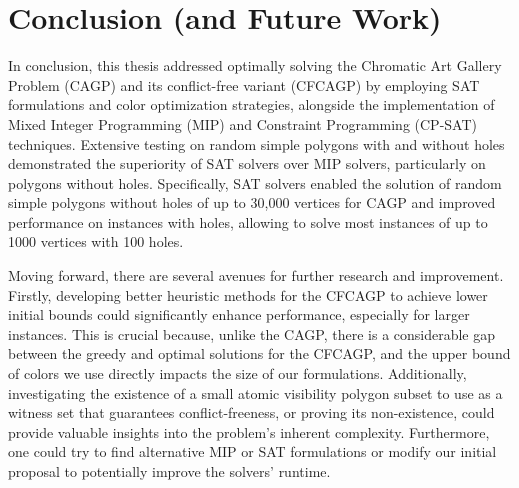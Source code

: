 \chapter{Conclusion (and Future Work)}

In conclusion, this thesis addressed optimally solving the Chromatic Art Gallery Problem (CAGP) and its conflict-free variant (CFCAGP) by employing SAT formulations and color optimization strategies, alongside the implementation of Mixed Integer Programming (MIP) and Constraint Programming (CP-SAT) techniques. Extensive testing on random simple polygons with and without holes demonstrated the superiority of SAT solvers over MIP solvers, particularly on polygons without holes. Specifically, SAT solvers enabled the solution of random simple polygons without holes of up to 30,000 vertices for CAGP and improved performance on instances with holes, allowing to solve most instances of up to 1000 vertices with 100 holes.

Moving forward, there are several avenues for further research and improvement. Firstly, developing better heuristic methods for the CFCAGP to achieve lower initial bounds could significantly enhance performance, especially for larger instances. This is crucial because, unlike the CAGP, there is a considerable gap between the greedy and optimal solutions for the CFCAGP, and the upper bound of colors we use directly impacts the size of our formulations. Additionally, investigating the existence of a small atomic visibility polygon subset to use as a witness set that guarantees conflict-freeness, or proving its non-existence, could provide valuable insights into the problem's inherent complexity. Furthermore, one could try to find alternative MIP or SAT formulations or modify our initial proposal to potentially improve the solvers' runtime.





